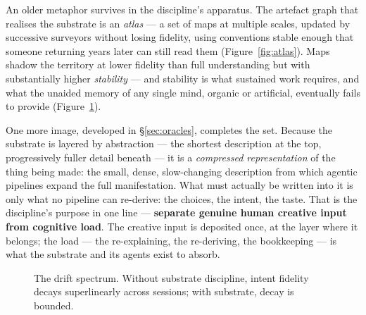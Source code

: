 \documentclass[11pt,a4paper,twocolumn]{article}
\begin{document}
An older metaphor survives in the discipline's apparatus. The
artefact graph that realises the substrate is an \emph{atlas} ---
a set of maps at multiple scales, updated by successive surveyors
without losing fidelity, using conventions stable enough that
someone returning years later can still read them
(Figure~\ref{fig:atlas}). Maps shadow the territory at lower
fidelity than full understanding but with substantially higher
\emph{stability} --- and stability is what sustained work
requires, and what the unaided memory of any single mind, organic
or artificial, eventually fails to provide
(Figure~\ref{fig:drift}).

One more image, developed in \S\ref{sec:oracles}, completes the
set. Because the substrate is layered by abstraction --- the
shortest description at the top, progressively fuller detail
beneath --- it is a \emph{compressed representation} of the thing
being made: the small, dense, slow-changing description from
which agentic pipelines expand the full manifestation. What must
actually be written into it is only what no pipeline can
re-derive: the choices, the intent, the taste. That is the
discipline's purpose in one line --- \textbf{separate genuine
human creative input from cognitive load}. The creative input is
deposited once, at the layer where it belongs; the load --- the
re-explaining, the re-deriving, the bookkeeping --- is what the
substrate and its agents exist to absorb.

\begin{figure}[t]
\centering
{}
\caption{The drift spectrum. Without substrate discipline, intent
fidelity decays superlinearly across sessions; with substrate,
decay is bounded.}
\label{fig:drift}
\end{figure}
\end{document}
